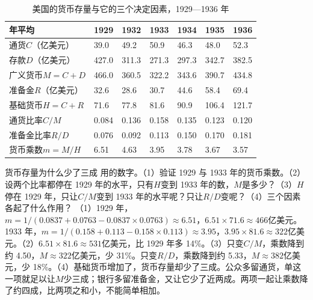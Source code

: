 \begin{table}[!tb]\centering\small
\caption{美国的货币存量与它的三个决定因素，1929—1936 年}\label{tab:depressionus-money}
\begin{tabularx}{\linewidth}{@{}lYYYYYY@{}}
\toprule
年平均 & 1929 & 1932 & 1933 & 1934 & 1935 & 1936 \\\midrule
通货$C$（亿美元） & 39.0 & 49.2 & 50.9 & 46.3 & 48.0 & 52.3 \\
存款$D$（亿美元） & 427.0 & 311.3 & 271.3 & 297.3 & 342.7 & 382.5 \\
广义货币$M=C+D$ & 466.0 & 360.5 & 322.2 & 343.6 & 390.7 & 434.8 \\
准备金$R$（亿美元） & 32.6 & 28.6 & 30.7 & 44.6 & 58.4 & 69.4 \\
基础货币$H=C+R$ & 71.6 & 77.8 & 81.6 & 90.9 & 106.4 & 121.7 \\
通货比率$C/M$ & 0.084 & 0.136 & 0.158 & 0.135 & 0.123 & 0.120 \\
准备金比率$R/D$ & 0.076 & 0.092 & 0.113 & 0.150 & 0.170 & 0.181 \\
货币乘数$m=M/H$ & 6.51 & 4.63 & 3.95 & 3.78 & 3.67 & 3.57 \\
\bottomrule
\end{tabularx}
\end{table}

\begin{example}{货币存量为什么少了三成}\label{ex:depressionus-mult}
用的数字。（1）验证 1929 与 1933 年的货币乘数。（2）设两个比率都停在 1929 年的水平，只有$H$变到 1933 年的数，$M$是多少？（3）$H$停在 1929 年，只让$C/M$变到 1933 年的水平呢？只让$R/D$变呢？（4）三个因素各起了什么作用？
\solution （1）1929 年，$m=1/(0.0837+0.0763-0.0837\times0.0763)\approx6.51$，$6.51\times71.6\approx466$亿美元。1933 年，$m=1/(0.158+0.113-0.158\times0.113)\approx3.95$，$3.95\times81.6\approx322$亿美元。（2）$6.51\times81.6\approx531$亿美元，比 1929 年多 14\%。（3）只变$C/M$，乘数降到约 4.50，$M\approx322$亿美元，少 31\%。只变$R/D$，乘数降到约 5.33，$M\approx382$亿美元，少 18\%。（4）基础货币增加了，货币存量却少了三成。公众多留通货，单这一项就足以让$M$少三成；银行多留准备金，又让它少了近两成。两项一起让乘数降了约四成，比两项之和小，不能简单相加。
\end{example}


